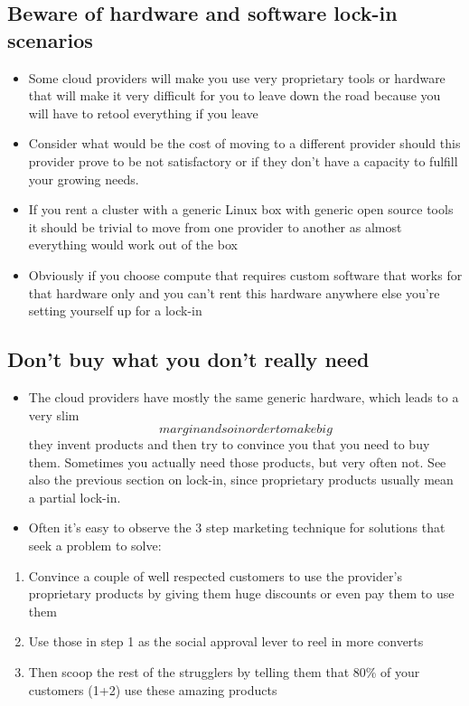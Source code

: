 \documentclass[
]{report}
\providecommand{\tightlist}{%
  \setlength{\itemsep}{0pt}\setlength{\parskip}{0pt}}\usepackage{longtable,booktabs,array}
\begin{document}
\subsection{Beware of hardware and software lock-in
scenarios}\label{beware-of-hardware-and-software-lock-in-scenarios}

\begin{itemize}
\item
  Some cloud providers will make you use very proprietary tools or
  hardware that will make it very difficult for you to leave down the
  road because you will have to retool everything if you leave
\item
  Consider what would be the cost of moving to a different provider
  should this provider prove to be not satisfactory or if they don't
  have a capacity to fulfill your growing needs.
\item
  If you rent a cluster with a generic Linux box with generic open
  source tools it should be trivial to move from one provider to another
  as almost everything would work out of the box
\item
  Obviously if you choose compute that requires custom software that
  works for that hardware only and you can't rent this hardware anywhere
  else you're setting yourself up for a lock-in
\end{itemize}

\subsection{Don't buy what you don't really
need}\label{dont-buy-what-you-dont-really-need}

\begin{itemize}
\item
  The cloud providers have mostly the same generic hardware, which leads
  to a very slim \[ margin and so in order to make big \] they invent
  products and then try to convince you that you need to buy them.
  Sometimes you actually need those products, but very often not. See
  also the previous section on lock-in, since proprietary products
  usually mean a partial lock-in.
\item
  Often it's easy to observe the 3 step marketing technique for
  solutions that seek a problem to solve:
\end{itemize}

\begin{enumerate}
\def\labelenumi{\arabic{enumi}.}
\tightlist
\item
  Convince a couple of well respected customers to use the provider's
  proprietary products by giving them huge discounts or even pay them to
  use them
\item
  Use those in step 1 as the social approval lever to reel in more
  converts
\item
  Then scoop the rest of the strugglers by telling them that 80\% of
  your customers (1+2) use these amazing products
\end{enumerate}
\end{document}
